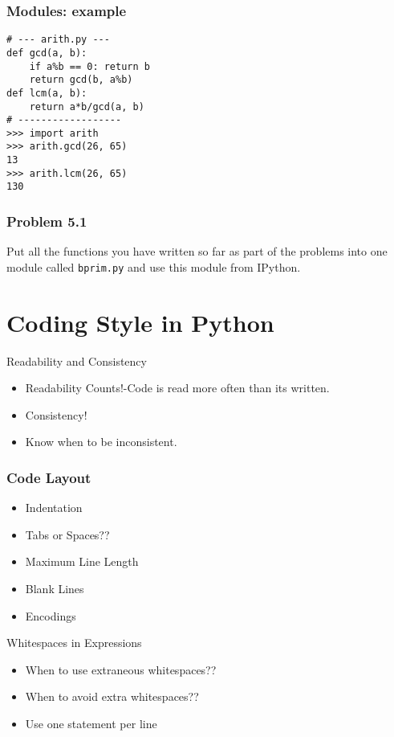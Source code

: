 \documentclass[14pt,compress]{beamer}
\newcounter{time}
\newcommand{\inctime}[1]{\addtocounter{time}{#1}{\tiny \thetime\ m}}
\newcommand{\typ}[1]{\texttt{#1}}
\begin{document}
\begin{frame}[fragile]
  \frametitle{Modules: example}
  \begin{lstlisting}
# --- arith.py ---
def gcd(a, b):
    if a%b == 0: return b
    return gcd(b, a%b)
def lcm(a, b):
    return a*b/gcd(a, b)
# ------------------
>>> import arith
>>> arith.gcd(26, 65)
13
>>> arith.lcm(26, 65)
130
  \end{lstlisting}
\end{frame}

\begin{frame}[fragile]
  \frametitle{Problem 5.1}

  Put all the functions you have written so far as part of the problems
  into one module called \typ{bprim.py} and use this module from IPython.

\inctime{25}
\end{frame}


\section{Coding Style in Python}
\begin{frame}{Readability and Consistency}
    \begin{itemize}
        \item Readability Counts!-Code is read more often than its written.
        \item Consistency!
        \item Know when to be inconsistent.
      \end{itemize}
\end{frame}

\begin{frame}[fragile]
  \frametitle{Code Layout}
  \begin{itemize}
        \item Indentation
        \item Tabs or Spaces??
        \item Maximum Line Length
        \item Blank Lines
        \item Encodings
   \end{itemize}
\end{frame}

\begin{frame}{Whitespaces in Expressions}
  \begin{itemize}
        \item When to use extraneous whitespaces??
        \item When to avoid extra whitespaces??
        \item Use one statement per line
   \end{itemize}
\end{frame}
\end{document}
